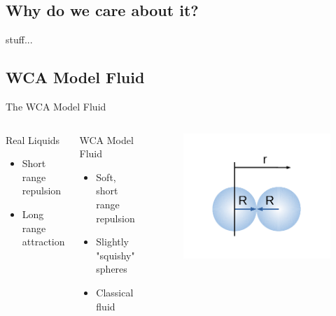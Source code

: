 \documentclass{beamer}
\begin{document}
\subsection*{Why do we care about it?}
\begin{frame}{}
stuff...
\end{frame}

\subsection*{WCA Model Fluid}
\begin{frame}{The WCA Model Fluid}
	\begin{columns}[t]
		\begin{block}{Real Liquids}
			\begin{itemize}
				\item Short range repulsion 
				\item Long range attraction 
			\end{itemize}
		\end{block}
		\begin{block}{WCA Model Fluid}
			\begin{itemize}
				\item Soft, short range repulsion
				\item Slightly "squishy" spheres
				\item Classical fluid				
			\end{itemize}
		\end{block}		
		\vspace{-3em}
          \begin{figure}
             \centering
             \includegraphics[width=1.1\columnwidth]{figs/TwoSpheresandplot.pdf} 
          \end{figure} 	 
	\end{columns}	
\end{frame}
\end{document}
